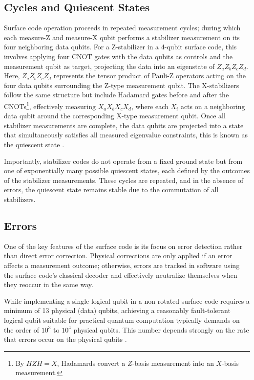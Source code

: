 \documentclass[9pt,a4paper,twocolumn,twoside]{tau-class/tau}
\begin{document}
\subsection{Cycles and Quiescent States}
Surface code operation proceeds in repeated measurement cycles; during which each measure-Z and measure-X qubit performs a stabilizer measurement on its four neighboring data qubits. For a Z-stabilizer in a 4-qubit surface code, this involves applying four CNOT gates with the data qubits as controls and the measurement qubit as target, projecting the data into an eigenstate of $Z_a Z_b Z_c Z_d$. Here, $Z_a Z_b Z_c Z_d$ represents the tensor product of Pauli-Z operators acting on the four data qubits surrounding the Z-type measurement qubit. The X-stabilizers follow the same structure but include Hadamard gates before and after the CNOTs\footnote{By \( H Z H = X \), Hadamards convert a \( Z \)-basis measurement into an \( X \)-basis measurement.}, effectively measuring $X_a X_b X_c X_d$, where each $X_i$ acts on a neighboring data qubit around the corresponding X-type measurement qubit. Once all stabilizer measurements are complete, the data qubits are projected into a state that simultaneously satisfies all measured eigenvalue constraints, this is known as the quiescent state \cite{fowler2012surface}. 

Importantly, stabilizer codes do not operate from a fixed ground state but from one of exponentially many possible quiescent states, each defined by the outcomes of the stabilizer measurements. These cycles are repeated, and in the absence of errors, the quiescent state remains stable due to the commutation of all stabilizers. 

\subsection{Errors}
One of the key features of the surface code is its focus on error detection rather than direct error correction. Physical corrections are only applied if an error affects a measurement outcome; otherwise, errors are tracked in software using the surface code’s classical decoder and effectively neutralize themselves when they reoccur in the same way.


While implementing a single logical qubit in a non-rotated surface code requires a minimum of 13 physical (data) qubits, achieving a reasonably fault-tolerant logical qubit suitable for practical quantum computation typically demands on the order of $10^3$ to $10^4$ physical qubits. This number depends strongly on the rate that errors occur on the physical qubits \cite{fowler2012surface}. 
\end{document}
